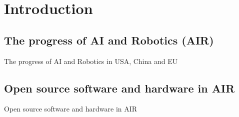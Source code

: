 \section{Introduction}

\subsection{The progress of AI and Robotics (AIR)}

{
\begin{frame}{The progress of AI and Robotics in USA, China and EU}
      \begin{figure}
        \centering
      \end{figure}
\end{frame}
}



\subsection{Open source software and hardware in AIR}

{
\begin{frame}{Open source software and hardware in AIR}
      \begin{figure}
        \centering
      \end{figure}
\end{frame}
}

